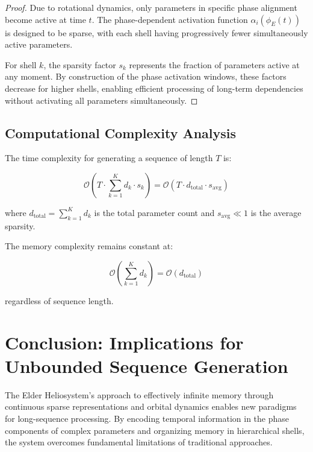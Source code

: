 \begin{proof}
Due to rotational dynamics, only parameters in specific phase alignment become active at time $t$. The phase-dependent activation function $\alpha_i(\phi_E(t))$ is designed to be sparse, with each shell having progressively fewer simultaneously active parameters.

For shell $k$, the sparsity factor $s_k$ represents the fraction of parameters active at any moment. By construction of the phase activation windows, these factors decrease for higher shells, enabling efficient processing of long-term dependencies without activating all parameters simultaneously.
\end{proof}

\subsection{Computational Complexity Analysis}

\begin{corollary}
The time complexity for generating a sequence of length $T$ is:

\begin{equation}
\mathcal{O}(T \cdot \sum_{k=1}^K d_k \cdot s_k) = \mathcal{O}(T \cdot d_{\text{total}} \cdot s_{\text{avg}})
\end{equation}

where $d_{\text{total}} = \sum_{k=1}^K d_k$ is the total parameter count and $s_{\text{avg}} \ll 1$ is the average sparsity.
\end{corollary}

\begin{corollary}
The memory complexity remains constant at:

\begin{equation}
\mathcal{O}(\sum_{k=1}^K d_k) = \mathcal{O}(d_{\text{total}})
\end{equation}

regardless of sequence length.
\end{corollary}



\section{Conclusion: Implications for Unbounded Sequence Generation}

The Elder Heliosystem's approach to effectively infinite memory through continuous sparse representations and orbital dynamics enables new paradigms for long-sequence processing. By encoding temporal information in the phase components of complex parameters and organizing memory in hierarchical shells, the system overcomes fundamental limitations of traditional approaches.


